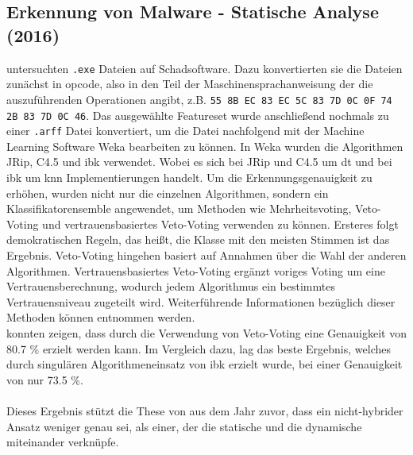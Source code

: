 \documentclass[
    12pt, %
    DIV10,
    ngerman, %
    a4paper, %
    oneside, %
    titlepage, %
    parskip=half, %
    headings=normal, %
    listof=totoc, %
    bibliography=totoc, %
    index=totoc, %
    captions=tableheading, %
    final %
]{scrreprt}
\begin{document}
\subsection{Erkennung von Malware - Statische Analyse (2016)}
\textcite{More2016} untersuchten \texttt{.exe} Dateien auf Schadsoftware. Dazu konvertierten sie die Dateien zunächst in \ac{opcode}, also in den Teil der Maschinensprachanweisung der die auszuführenden Operationen angibt, z.B. \texttt{55 8B EC 83 EC 5C 83 7D 0C 0F 74 2B 83 7D 0C 46}. Das ausgewählte Featureset wurde anschlie{\ss}end nochmals zu einer \texttt{.arff} Datei konvertiert, um die Datei nachfolgend mit der Machine Learning Software Weka bearbeiten zu können. 
In Weka wurden die Algorithmen JRip, C4.5 und \ac{ibk} verwendet. Wobei es sich bei JRip und C4.5 um \ac{dt} und bei \ac{ibk} um \ac{knn} Implementierungen handelt. Um die Erkennungsgenauigkeit zu erhöhen, wurden nicht nur die einzelnen Algorithmen, sondern ein Klassifikatorensemble angewendet, um Methoden wie Mehrheitsvoting, Veto-Voting und vertrauensbasiertes Veto-Voting verwenden zu können. Ersteres folgt demokratischen Regeln, das hei{\ss}t, die Klasse mit den meisten Stimmen ist das Ergebnis. Veto-Voting hingehen basiert auf Annahmen über die Wahl der anderen Algorithmen. Vertrauensbasiertes Veto-Voting ergänzt voriges Voting um eine Vertrauensberechnung, wodurch jedem Algorithmus ein bestimmtes Vertrauensniveau zugeteilt wird. Weiterführende Informationen bezüglich dieser Methoden können \textcite{shahzad2013comparative} entnommen werden. \\
\textcite{More2016} konnten zeigen, dass durch die Verwendung von Veto-Voting eine Genauigkeit von 80.7 \% erzielt werden kann. Im Vergleich dazu, lag das beste Ergebnis, welches durch singulären Algorithmeneinsatz von \ac{ibk} erzielt wurde, bei einer Genauigkeit von nur 73.5 \%.\\\\
Dieses Ergebnis stützt die These von \textcite{Shijo2015} aus dem Jahr zuvor, dass ein nicht-hybrider Ansatz weniger genau sei, als einer, der die statische und die dynamische miteinander verknüpfe.
\end{document}
